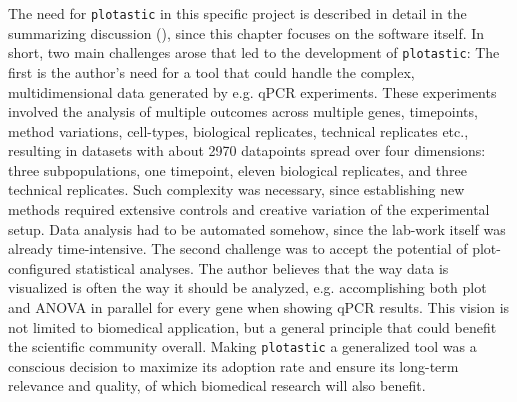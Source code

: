 \pagebreak

The need for \texttt{plotastic} in this specific project is described in detail
in the summarizing discussion
(), since this chapter focuses
on the software itself. In short, two main challenges arose that led to the
development of \texttt{plotastic}: The first is the author's need for a tool
that could handle the complex, multidimensional data generated by e.g. qPCR
experiments. These experiments involved the analysis of multiple outcomes across
multiple genes, timepoints, method variations, cell-types, biological
replicates, technical replicates etc., resulting in datasets with about 2970
datapoints spread over four dimensions: three subpopulations, one timepoint,
eleven biological replicates, and three technical replicates. Such complexity
was necessary, since establishing new methods required extensive controls and
creative variation of the experimental setup. Data analysis had to be automated
somehow, since the lab-work itself was already time-intensive. The second
challenge was to accept the potential of plot-configured statistical analyses.
The author believes that the way data is visualized is often the way it should
be analyzed, e.g. accomplishing both plot and ANOVA in parallel for every gene
when showing qPCR results. This vision is not limited to biomedical application,
but a general principle that could benefit the scientific community overall.
Making \texttt{plotastic} a generalized tool was a conscious decision to
maximize its adoption rate and ensure its long-term relevance and quality, of
which biomedical research will also benefit.













